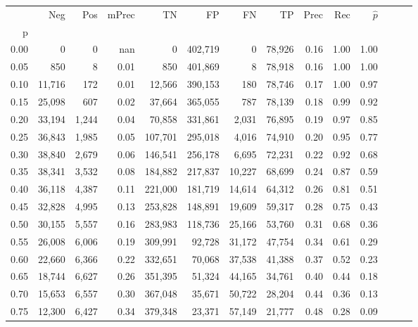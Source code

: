 \begin{tabular}{rrrrrrrrrrrrrr}
\toprule
{} &     Neg &    Pos & mPrec &       TN &       FP &      FN &      TP &  Prec &   Rec & $\hat{p}$ \\
p    &         &        &       &          &          &         &         &       &       &           \\
\midrule
0.00 &       0 &      0 &   nan &        0 &  402,719 &       0 &  78,926 &  0.16 &  1.00 &      1.00 \\
0.05 &     850 &      8 &  0.01 &      850 &  401,869 &       8 &  78,918 &  0.16 &  1.00 &      1.00 \\
0.10 &  11,716 &    172 &  0.01 &   12,566 &  390,153 &     180 &  78,746 &  0.17 &  1.00 &      0.97 \\
0.15 &  25,098 &    607 &  0.02 &   37,664 &  365,055 &     787 &  78,139 &  0.18 &  0.99 &      0.92 \\
0.20 &  33,194 &  1,244 &  0.04 &   70,858 &  331,861 &   2,031 &  76,895 &  0.19 &  0.97 &      0.85 \\
0.25 &  36,843 &  1,985 &  0.05 &  107,701 &  295,018 &   4,016 &  74,910 &  0.20 &  0.95 &      0.77 \\
0.30 &  38,840 &  2,679 &  0.06 &  146,541 &  256,178 &   6,695 &  72,231 &  0.22 &  0.92 &      0.68 \\
0.35 &  38,341 &  3,532 &  0.08 &  184,882 &  217,837 &  10,227 &  68,699 &  0.24 &  0.87 &      0.59 \\
0.40 &  36,118 &  4,387 &  0.11 &  221,000 &  181,719 &  14,614 &  64,312 &  0.26 &  0.81 &      0.51 \\
0.45 &  32,828 &  4,995 &  0.13 &  253,828 &  148,891 &  19,609 &  59,317 &  0.28 &  0.75 &      0.43 \\
0.50 &  30,155 &  5,557 &  0.16 &  283,983 &  118,736 &  25,166 &  53,760 &  0.31 &  0.68 &      0.36 \\
0.55 &  26,008 &  6,006 &  0.19 &  309,991 &   92,728 &  31,172 &  47,754 &  0.34 &  0.61 &      0.29 \\
0.60 &  22,660 &  6,366 &  0.22 &  332,651 &   70,068 &  37,538 &  41,388 &  0.37 &  0.52 &      0.23 \\
0.65 &  18,744 &  6,627 &  0.26 &  351,395 &   51,324 &  44,165 &  34,761 &  0.40 &  0.44 &      0.18 \\
0.70 &  15,653 &  6,557 &  0.30 &  367,048 &   35,671 &  50,722 &  28,204 &  0.44 &  0.36 &      0.13 \\
0.75 &  12,300 &  6,427 &  0.34 &  379,348 &   23,371 &  57,149 &  21,777 &  0.48 &  0.28 &      0.09 \\

\end{tabular}
